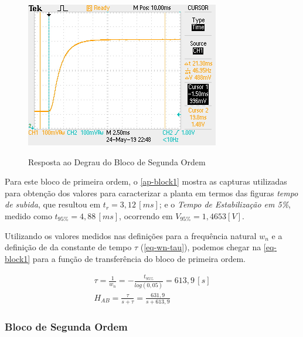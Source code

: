 \documentclass[
	12pt,				%
	article,			%
	openright,			%
	oneside,
	a4paper,			%
	chapter=TITLE,		%
	section=TITLE,		%
	english,			%
	french,				%
	spanish,			%
	brazil,				%
]{abntex2}
\begin{document}
        	\begin{figure}[htbp]
            	\centering
            	\caption{Resposta ao Degrau do Bloco de Segunda Ordem}
            	\includegraphics[width=\textwidth,height=240px,keepaspectratio]{imgs/block1/step_response.JPG}
            	\label{fig-block1-step}
        	\end{figure}
        	
        	Para este bloco de primeira ordem, o \autoref{ap-block1} mostra as capturas utilizadas para obtenção dos valores para caracterizar a planta em termos das figuras \textit{tempo de subida}, que resultou em $t_r=3,12\,[ms]$; e o \textit{Tempo de Estabilização em 5\%}, medido como $t_{95\%}=4,88\,[ms]$, ocorrendo em $V_{95\%}=1,4653[V]$.
        	
        	Utilizando os valores medidos nas definições para a frequência natural $w_n$ e a definição de da constante de tempo $\tau$ (\autoref{eq-wn-tau}), podemos chegar na \autoref{eq-block1} para a função de transferência do bloco de primeira ordem.
        	
        	\begin{eqnarray}
        	    \label{eq-wn-tau}
        	    \tau = \frac{1}{w_n} = -\frac{t_{95\%}}{log(0,05)} = 613,9\,[s] \\
        	    \label{eq-block1}
        	    H_{AB} = \frac{\tau}{s + \tau} = \frac{631,9}{s + 613,9}
        	\end{eqnarray}
    
        	\subsubsection{Bloco de Segunda Ordem}
        	
\end{document}
